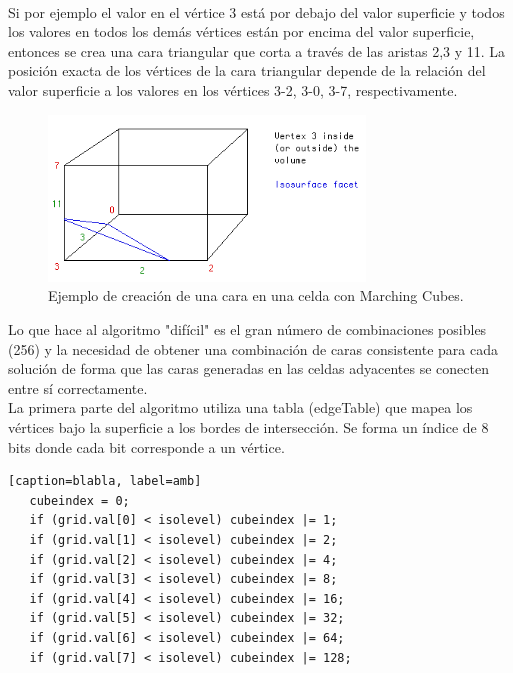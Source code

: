 \documentclass[12pt]{article}
\begin{document}
\\Si por ejemplo el valor en el vértice 3 está por debajo del valor superficie y todos los valores en todos los demás vértices están por encima del valor superficie, entonces se crea una cara triangular que corta a través de las aristas 2,3 y 11. La posición exacta de los vértices de la cara triangular depende de la relación del valor superficie a los valores en los vértices 3-2, 3-0, 3-7, respectivamente.
\begin{figure}[h!]
\includegraphics[width=0.75\textwidth,center]{marchingcubes2.png}
\caption{Ejemplo de creación de una cara en una celda con Marching Cubes.}
\end{figure}
Lo que hace al algoritmo "difícil" es el gran número de combinaciones posibles (256) y la necesidad de obtener una combinación de caras consistente para cada solución de forma que las caras generadas en las celdas adyacentes se conecten entre sí correctamente.\\
La primera parte del algoritmo utiliza una tabla (edgeTable) que mapea los vértices bajo la superficie a los bordes de intersección. Se forma un índice de 8 bits donde cada bit corresponde a un vértice.
\lstset{language=C}          %

\begin{lstlisting}[frame=single][caption=blabla, label=amb]
   cubeindex = 0;
   if (grid.val[0] < isolevel) cubeindex |= 1;
   if (grid.val[1] < isolevel) cubeindex |= 2;
   if (grid.val[2] < isolevel) cubeindex |= 4;
   if (grid.val[3] < isolevel) cubeindex |= 8;
   if (grid.val[4] < isolevel) cubeindex |= 16;
   if (grid.val[5] < isolevel) cubeindex |= 32;
   if (grid.val[6] < isolevel) cubeindex |= 64;
   if (grid.val[7] < isolevel) cubeindex |= 128;
\end{lstlisting}
\end{document}
